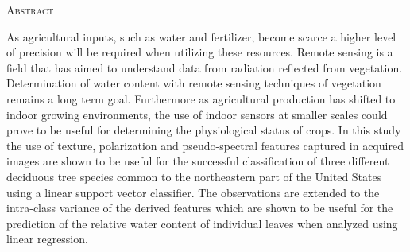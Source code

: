 \begin{center}
  \textsc{Abstract}
\end{center}
%
\noindent
%
As agricultural inputs, such as water and fertilizer, become scarce a higher level of precision will be required when utilizing these resources. Remote sensing is a field that has aimed to understand data from radiation reflected from vegetation.  Determination of water content with remote sensing techniques
of vegetation remains a long term goal.  Furthermore as agricultural production has shifted to indoor
growing environments, the use of indoor sensors at smaller scales could prove to be useful for determining the
physiological status of crops. In this study the use of texture, polarization and pseudo-spectral features captured in
acquired images are shown to be useful for the successful classification of
three different deciduous tree species common to the northeastern part of the
United States using a linear support vector classifier. The observations
are extended to the intra-class variance of the derived features which are shown
to be useful for the prediction of the relative water content of individual leaves when
analyzed using linear regression.
